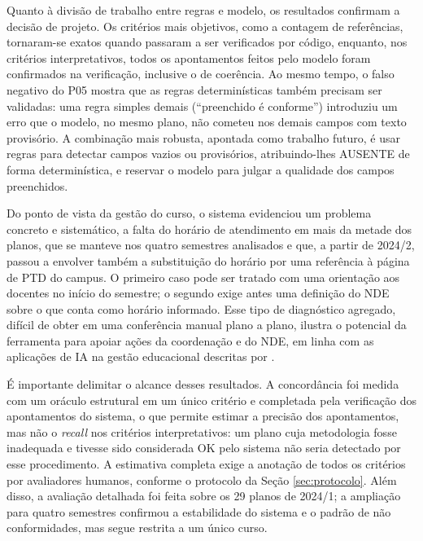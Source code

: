 Quanto à divisão de trabalho entre regras e modelo, os resultados confirmam a decisão de projeto. Os critérios mais objetivos, como a contagem de referências, tornaram-se exatos quando passaram a ser verificados por código, enquanto, nos critérios interpretativos, todos os apontamentos feitos pelo modelo foram confirmados na verificação, inclusive o de coerência. Ao mesmo tempo, o falso negativo do P05 mostra que as regras determinísticas também precisam ser validadas: uma regra simples demais (``preenchido é conforme'') introduziu um erro que o modelo, no mesmo plano, não cometeu nos demais campos com texto provisório. A combinação mais robusta, apontada como trabalho futuro, é usar regras para detectar campos vazios ou provisórios, atribuindo-lhes AUSENTE de forma determinística, e reservar o modelo para julgar a qualidade dos campos preenchidos.

Do ponto de vista da gestão do curso, o sistema evidenciou um problema concreto e sistemático, a falta do horário de atendimento em mais da metade dos planos, que se manteve nos quatro semestres analisados e que, a partir de 2024/2, passou a envolver também a substituição do horário por uma referência à página de PTD do campus. O primeiro caso pode ser tratado com uma orientação aos docentes no início do semestre; o segundo exige antes uma definição do NDE sobre o que conta como horário informado. Esse tipo de diagnóstico agregado, difícil de obter em uma conferência manual plano a plano, ilustra o potencial da ferramenta para apoiar ações da coordenação e do NDE, em linha com as aplicações de IA na gestão educacional descritas por .

É importante delimitar o alcance desses resultados. A concordância foi medida com um oráculo estrutural em um único critério e completada pela verificação dos apontamentos do sistema, o que permite estimar a precisão dos apontamentos, mas não o \textit{recall} nos critérios interpretativos: um plano cuja metodologia fosse inadequada e tivesse sido considerada OK pelo sistema não seria detectado por esse procedimento. A estimativa completa exige a anotação de todos os critérios por avaliadores humanos, conforme o protocolo da Seção \ref{sec:protocolo}. Além disso, a avaliação detalhada foi feita sobre os 29 planos de 2024/1; a ampliação para quatro semestres confirmou a estabilidade do sistema e o padrão de não conformidades, mas segue restrita a um único curso.
